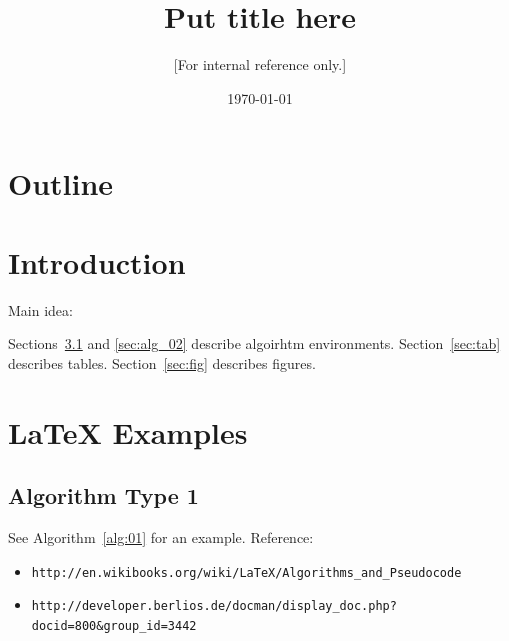 \documentclass[12pt,a4paper]{article}
\begin{document}
\title{Put title here}
\author{[For internal reference only.]}
\date{\today}
\maketitle




\setcounter{section}{-1}
\section{Outline}

\section{Introduction}

Main idea:
\cite{xyz}

Sections~\ref{sec:alg_01} and \ref{sec:alg_02} describe algoirhtm
environments.  Section~\ref{sec:tab} describes tables.
Section~\ref{sec:fig} describes figures.

\section{LaTeX Examples}


\subsection{Algorithm Type 1}
\label{sec:alg_01}

See Algorithm~\ref{alg:01} for an example. Reference:
\begin{itemize}
\item {\tt http://en.wikibooks.org/wiki/LaTeX/Algorithms\_and\_Pseudocode}
\item {\tt http://developer.berlios.de/docman/display\_doc.php?docid=800\&group\_id=3442}
\end{itemize}
\end{document}
